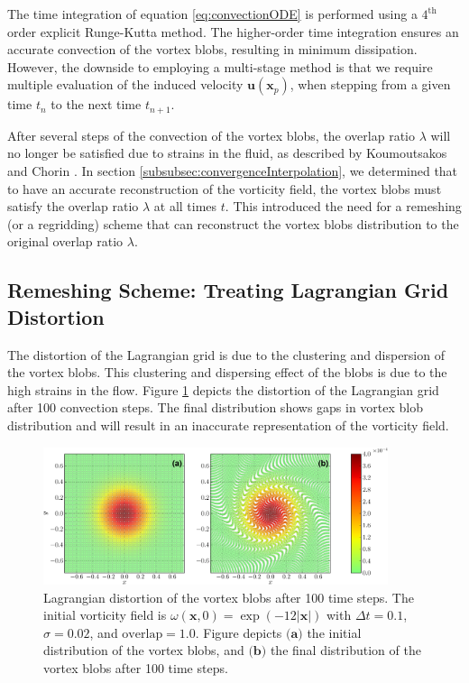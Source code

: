 The time integration of equation \ref{eq:convectionODE} is performed using a $4^{\mathrm{th}}$ order explicit Runge-Kutta method. The higher-order time integration ensures an accurate convection of the vortex blobs, resulting in minimum dissipation. However, the downside to employing a multi-stage method is that we require multiple evaluation of the induced velocity $\mathbf{u}\left(\mathbf{x}_p\right)$, when stepping from a given time $t_n$ to the next time $t_{n+1}$.

After several steps of the convection of the vortex blobs, the overlap ratio $\lambda$ will no longer be satisfied due to strains in the fluid, as described by Koumoutsakos and Chorin \cite{Cottet2000a}. In section \ref{subsubsec:convergenceInterpolation}, we determined that to have an accurate reconstruction of the vorticity field, the vortex blobs must satisfy the overlap ratio $\lambda$ at all times $t$. This introduced the need for a remeshing (or a regridding) scheme that can reconstruct the vortex blobs distribution to the original overlap ratio $\lambda$.

\subsection{Remeshing Scheme: Treating Lagrangian Grid Distortion}
\label{subsec:remeshing}

The distortion of the Lagrangian grid is due to the clustering and dispersion of the vortex blobs. This clustering and dispersing effect of the blobs is due to the high strains in the flow. Figure \ref{fig:distortion} depicts the distortion of the Lagrangian grid after 100 convection steps. The final distribution shows gaps in vortex blob distribution and will result in an inaccurate representation of the vorticity field. 

	\begin{figure}[!b]
	\centering
	\includegraphics[width=0.9\textwidth]{figures/lagrangian/distortion-crop.pdf}
    \caption{Lagrangian distortion of the vortex blobs after 100 time steps. The initial vorticity field is $\omega\left(\mathbf{x},0\right) = \exp\left(-12\left|\mathbf{x}\right|\right)$ with $\Delta t = 0.1$, $\sigma=0.02$, and $\mathrm{overlap} = 1.0$. Figure depicts $\textbf{(a)}$ the initial distribution of the vortex blobs, and $\textbf{(b)}$ the final distribution of the vortex blobs after 100 time steps.}
    \label{fig:distortion}
	\end{figure}

